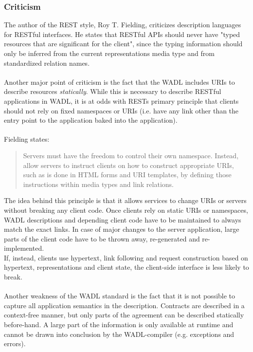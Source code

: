 \subsubsection{Criticism}
The author of the REST style, Roy T. Fielding, criticizes description languages for RESTful interfaces. He states that RESTful APIs should never have "typed resources that are significant for the client", since the typing information should only be inferred from the current representations media type and from standardized relation names.  \cite{FIELDBLOG}
\\ \\
Another major point of criticism is the fact that the WADL includes URIs to describe resources \emph{statically}. While this is necessary to describe RESTful applications in WADL, it is at odds with RESTs primary principle that clients should not rely on fixed namespaces or URIs (i.e. have any link other than the entry point to the application baked into the application).
\\ \\
Fielding states:
\begin{quote}
Servers must have the freedom to control their own namespace. Instead, allow servers to instruct clients on how to construct appropriate URIs, such as is done in HTML forms and URI templates, by defining those instructions within media types and link relations. \cite{FIELDBLOG}
\end{quote}
The idea behind this principle is that it allows services to change URIs or servers without breaking any client code. Once clients rely on static URIs or namespaces, WADL descriptions and depending client code have to be maintained to always match the exact links. In case of major changes to the server application, large parts of the client code have to be thrown away, re-generated and re-implemented.
\\
If, instead, clients use hypertext, link following and request construction based on hypertext, representations and client state, the client-side interface is less likely to break. \cite{GREGBLOG}
\\ \\
Another weakness of the WADL standard is the fact that it is not possible to capture all application semantics in the description. Contracts are described in a context-free manner, but only parts of the agreement can be described statically before-hand. A large part of the information is only available at runtime and cannot be drawn into conclusion by the WADL-compiler (e.g. exceptions and errors).